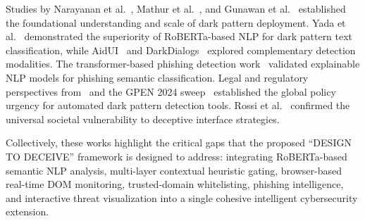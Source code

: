 Studies by Narayanan et al.~\cite{narayanan2020}, Mathur et al.~\cite{mathur2019}, and Gunawan et al.~\cite{gunawan2021} established the foundational understanding and scale of dark pattern deployment. Yada et al.~\cite{yada2022} demonstrated the superiority of RoBERTa-based NLP for dark pattern text classification, while AidUI~\cite{aidui2023} and DarkDialogs~\cite{darkdialogs2023} explored complementary detection modalities. The transformer-based phishing detection work~\cite{phishing2024} validated explainable NLP models for phishing semantic classification. Legal and regulatory perspectives from~\cite{legal2023} and the GPEN 2024 sweep~\cite{gpen2024} established the global policy urgency for automated dark pattern detection tools. Rossi et al.~\cite{rossi2024} confirmed the universal societal vulnerability to deceptive interface strategies.

Collectively, these works highlight the critical gaps that the proposed ``DESIGN TO DECEIVE'' framework is designed to address: integrating RoBERTa-based semantic NLP analysis, multi-layer contextual heuristic gating, browser-based real-time DOM monitoring, trusted-domain whitelisting, phishing intelligence, and interactive threat visualization into a single cohesive intelligent cybersecurity extension.

